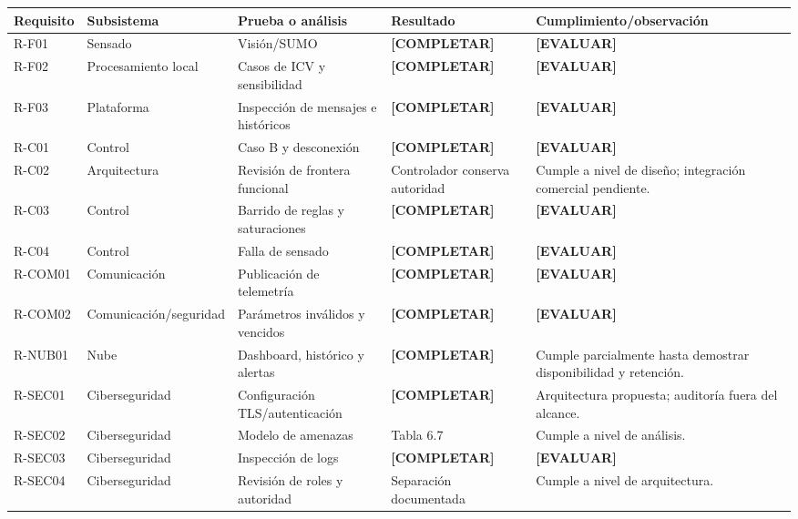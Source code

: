 \documentclass[12pt,a4paper,oneside]{report}
\begin{document}
\begin{landscape}
\footnotesize
{}
\label{tbl:cumplimiento-v2}
\begin{longtable}{@{}p{2.2cm}p{4.0cm}p{5.0cm}p{3.5cm}p{7.0cm}@{}}
\toprule
\textbf{Requisito} & \textbf{Subsistema} & \textbf{Prueba o análisis} & \textbf{Resultado} & \textbf{Cumplimiento/observación}\\
\midrule
\endhead
R-F01 & Sensado & Visión/SUMO & \textbf{[COMPLETAR]} & \textbf{[EVALUAR]}\\
R-F02 & Procesamiento local & Casos de ICV y sensibilidad & \textbf{[COMPLETAR]} & \textbf{[EVALUAR]}\\
R-F03 & Plataforma & Inspección de mensajes e históricos & \textbf{[COMPLETAR]} & \textbf{[EVALUAR]}\\
R-C01 & Control & Caso B y desconexión & \textbf{[COMPLETAR]} & \textbf{[EVALUAR]}\\
R-C02 & Arquitectura & Revisión de frontera funcional & Controlador conserva autoridad & Cumple a nivel de diseño; integración comercial pendiente.\\
R-C03 & Control & Barrido de reglas y saturaciones & \textbf{[COMPLETAR]} & \textbf{[EVALUAR]}\\
R-C04 & Control & Falla de sensado & \textbf{[COMPLETAR]} & \textbf{[EVALUAR]}\\
R-COM01 & Comunicación & Publicación de telemetría & \textbf{[COMPLETAR]} & \textbf{[EVALUAR]}\\
R-COM02 & Comunicación/seguridad & Parámetros inválidos y vencidos & \textbf{[COMPLETAR]} & \textbf{[EVALUAR]}\\
R-NUB01 & Nube & Dashboard, histórico y alertas & \textbf{[COMPLETAR]} & Cumple parcialmente hasta demostrar disponibilidad y retención.\\
R-SEC01 & Ciberseguridad & Configuración TLS/autenticación & \textbf{[COMPLETAR]} & Arquitectura propuesta; auditoría fuera del alcance.\\
R-SEC02 & Ciberseguridad & Modelo de amenazas & Tabla 6.7 & Cumple a nivel de análisis.\\
R-SEC03 & Ciberseguridad & Inspección de logs & \textbf{[COMPLETAR]} & \textbf{[EVALUAR]}\\
R-SEC04 & Ciberseguridad & Revisión de roles y autoridad & Separación documentada & Cumple a nivel de arquitectura.\\

\end{longtable}
\end{landscape}
\end{document}

